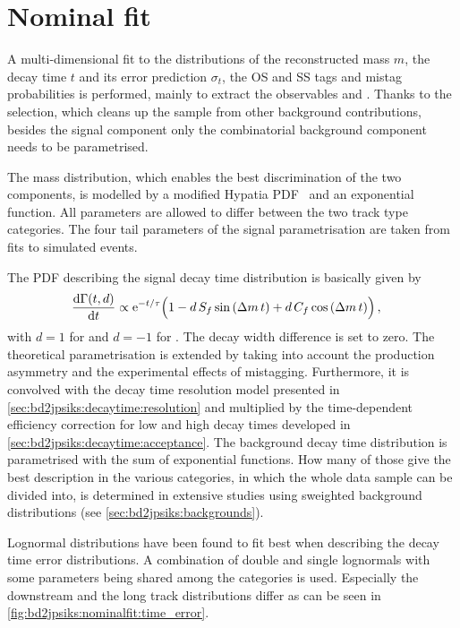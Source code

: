 
\section{Nominal fit}
\label{sec:bd2jpsiks:nominalfit}

A multi-dimensional fit to the distributions of the reconstructed mass $m$,
the decay time $t$ and its error prediction $\sigma_t$, the OS and SS\pion
tags and mistag probabilities is performed, mainly to extract the \CP
observables \SJpsiKS and \CJpsiKS. Thanks to the selection, which cleans up
the sample from other background contributions, besides the signal component
only the combinatorial background component needs to be parametrised.

The mass distribution, which enables the best discrimination of the two
components, is modelled by a modified Hypatia PDF~\cite{Santos:2013ky} and an
exponential function. All parameters are allowed to differ between the two
track type categories. The four tail parameters of the signal parametrisation
are taken from fits to simulated events.

The PDF describing the signal decay time distribution is basically given by
\begin{equation}
\begin{aligned}
  \frac{\mathrm{d}\Gamma(t,d)}{\mathrm{d}t}
  &\propto \mathrm{e}^{-t/\tau}
    \Big(
      1
      - d\, \Sf \sin{\left(\dm\,t\right)}
      + d\, \Cf \cos{\left(\dm\,t\right)}
    \Big)\,,
\end{aligned}
\label{eq:simpledecayrates}
\end{equation}
with $d = \num{+1}$ for \Bd and $d = \num{-1}$ for \Bdb. The decay width
difference \DGd is set to zero. The theoretical parametrisation is extended by
taking into account the production asymmetry and the experimental effects of
mistagging. Furthermore, it is convolved with the decay time resolution model
presented in \cref{sec:bd2jpsiks:decaytime:resolution} and multiplied by the
time-dependent efficiency correction for low and high decay times developed in
\cref{sec:bd2jpsiks:decaytime:acceptance}. The background decay time
distribution is parametrised with the sum of exponential functions. How many
of those give the best description in the various categories, in which the
whole data sample can be divided into, is determined in extensive studies
using sweighted background distributions (see
\cref{sec:bd2jpsiks:backgrounds}).

Lognormal distributions have been found to fit best when describing the decay
time error distributions. A combination of double and single lognormals with
some parameters being shared among the categories is used. Especially the
downstream and the long track distributions differ as can be seen in
\cref{fig:bd2jpsiks:nominalfit:time_error}.

